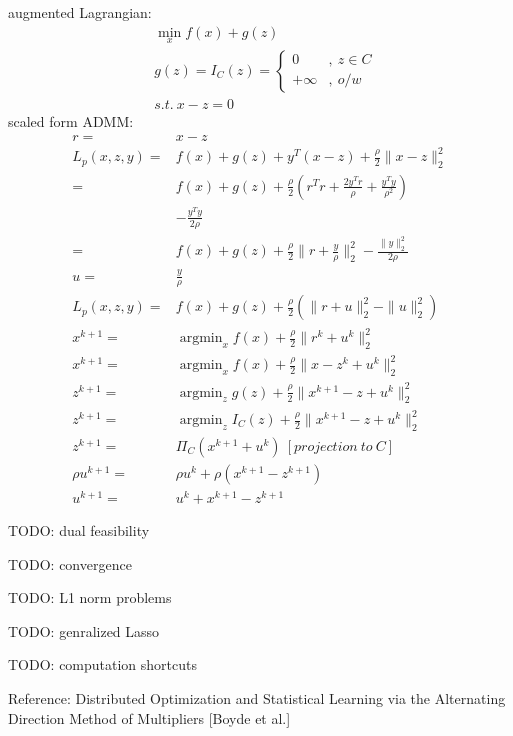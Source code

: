 \documentclass[8pt]{report}
\DeclareMathOperator*{\argmin}{argmin}
\newcommand{\norm}[1]{\|#1\|}
\begin{document}
\begin{multicols*}{2}
  augmented Lagrangian:
  \begin{align*}
    &\min_x f(x) + g(z)\\
    &g(z) = I_C(z)=
      \begin{cases}
        0 &,\ z \in C\\
        +\infty &,\ o/w
      \end{cases}\\
    &s.t.\ x-z=0
  \end{align*}
  scaled form ADMM:
  \begin{align*}
    r=&x-z\\
    L_p(x,z,y) =& f(x) + g(z) + y^T(x-z) + \frac{\rho}{2} \norm{x-z}_2^2\\
               =& f(x) + g(z) + \frac{\rho}{2}(r^T r + \frac{2 y^T r}{\rho} + \frac{y^T y}{\rho^2})\\
                & - \frac{y^T y}{2 \rho}\\
    =& f(x) + g(z) + \frac{\rho}{2} \norm{r+\frac{y}{\rho}}_2^2 - \frac{\norm{y}_2^2}{2\rho}\\
    u=& \frac{y}{\rho}\\
    L_p(x,z,y) =& f(x) + g(z) + \frac{\rho}{2}(\norm{r+u}_2^2 - \norm{u}_2^2)\\
    x^{k+1} =& \argmin_x f(x) + \frac{\rho}{2} \norm{r^k+u^k}_2^2\\
    x^{k+1} =& \argmin_x f(x) + \frac{\rho}{2} \norm{x-z^k+u^k}_2^2\\
    z^{k+1} =& \argmin_z g(z) + \frac{\rho}{2} \norm{x^{k+1}-z+u^k}_2^2\\
    z^{k+1} =& \argmin_z I_C(z) + \frac{\rho}{2} \norm{x^{k+1}-z+u^k}_2^2\\
    z^{k+1} =& \Pi_C(x^{k+1}+u^k)\ [projection\ to\ C]\\
    \rho u^{k+1} =& \rho u^k + \rho (x^{k+1} - z^{k+1})\\
    u^{k+1} =& u^k + x^{k+1} - z^{k+1}
  \end{align*}

  TODO: dual feasibility

  TODO: convergence

  TODO: L1 norm problems

  TODO: genralized Lasso

  TODO: computation shortcuts
  
  Reference: Distributed Optimization and Statistical Learning via the Alternating Direction Method of Multipliers [Boyde et al.]
  
  \vfill\null
  

\end{multicols*}
\end{document}
